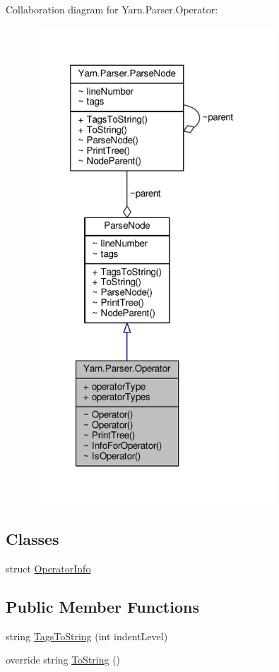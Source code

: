 Collaboration diagram for Yarn.\-Parser.\-Operator\-:
\nopagebreak
\begin{figure}[H]
\begin{center}
\leavevmode
\includegraphics[width=254pt]{d1/d6e/a00613}
\end{center}
\end{figure}
\subsection*{Classes}
\begin{DoxyCompactItemize}
\item 
struct \hyperlink{a00118}{Operator\-Info}
\end{DoxyCompactItemize}
\subsection*{Public Member Functions}
\begin{DoxyCompactItemize}
\item 
string \hyperlink{a00122_a054f36c80d5eeacd569a8859f599af67}{Tags\-To\-String} (int indent\-Level)
\item 
override string \hyperlink{a00122_a18c67cb16090d0889bb9d6c8c6c565f8}{To\-String} ()
\end{DoxyCompactItemize}
